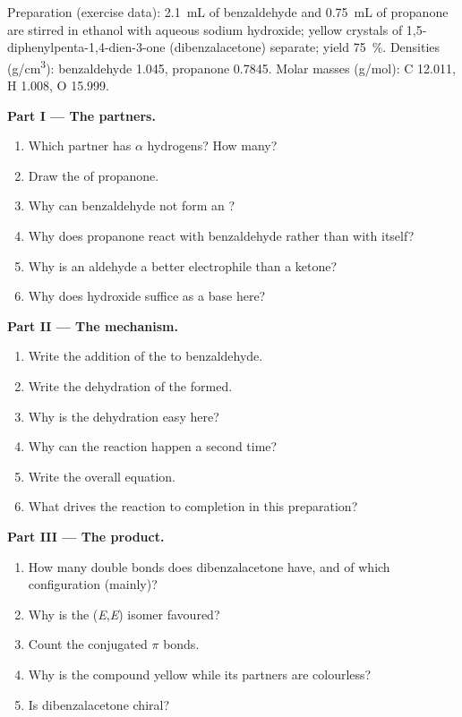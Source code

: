 \begin{problem}
\label{pb:b2:enolates-aldol:1}
Preparation (exercise data): \qty{2.1}{mL} of benzaldehyde and \qty{0.75}{mL} of propanone are stirred
in ethanol with aqueous sodium hydroxide; yellow crystals of 1,5-diphenylpenta-1,4-dien-3-one
(dibenzalacetone) separate; yield 75~\%. Densities (\unit{g/cm^3}): benzaldehyde 1.045, propanone 0.7845.
Molar masses (\unit{g/mol}): C 12.011, H 1.008, O 15.999.

\medskip
\noindent\textbf{Part I --- The partners.}
\begin{enumerate}
  \item Which partner has $\alpha$ hydrogens? How many?
  \item Draw the  of propanone.
  \item Why can benzaldehyde not form an ?
  \item Why does propanone react with benzaldehyde rather than with itself?
  \item Why is an aldehyde a better electrophile than a ketone?
  \item Why does hydroxide suffice as a base here?
\end{enumerate}

\medskip
\noindent\textbf{Part II --- The mechanism.}
\begin{enumerate}[resume]
  \item Write the addition of the  to benzaldehyde.
  \item Write the dehydration of the  formed.
  \item Why is the dehydration easy here?
  \item Why can the reaction happen a second time?
  \item Write the overall equation.
  \item What drives the reaction to completion in this preparation?
\end{enumerate}

\medskip
\noindent\textbf{Part III --- The product.}
\begin{enumerate}[resume]
  \item How many  double bonds does dibenzalacetone have, and of which configuration (mainly)?
  \item Why is the (\textit{E},\textit{E}) isomer favoured?
  \item Count the conjugated $\pi$ bonds.
  \item Why is the compound yellow while its partners are colourless?
  \item Is dibenzalacetone chiral?
\end{enumerate}


\end{problem}
